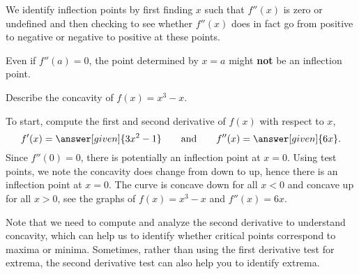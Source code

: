 \documentclass{ximera}
\begin{document}
We identify inflection points by first finding $x$ such that $f''(x)$
is zero or undefined and then checking to see whether $f''(x)$ does in
fact go from positive to negative or negative to positive at these
points.

\begin{warning}
Even if $f''(a) = 0$, the point determined by $x=a$ might \textbf{not}
be an inflection point.
\end{warning}


\begin{example}
Describe the concavity of $f(x)=x^3-x$. 

\begin{explanation}
To start, compute the first and second derivative of $f(x)$ with
respect to $x$,
\[
f'(x)=\answer[given]{3x^2-1}\qquad\text{and}\qquad f''(x)=\answer[given]{6x}.
\]
Since $f''(0)=0$, there is potentially an inflection point at
$x=0$. Using test points, we note the concavity does change from down
to up, hence there is an inflection point at $x=0$. The curve is
concave down for all $x<0$ and concave up for all $x>0$, see the
graphs of $f(x) = x^3-x$ and $f''(x) = 6x$.
\begin{image}
\end{image}
\end{explanation}
\end{example}

Note that we need to compute and analyze the second derivative to understand concavity, which can help us to identify whether critical points correspond to maxima or minima.  Sometimes, rather than using the first derivative test for extrema, the second derivative test can also help you to identify extrema.
\end{document}
